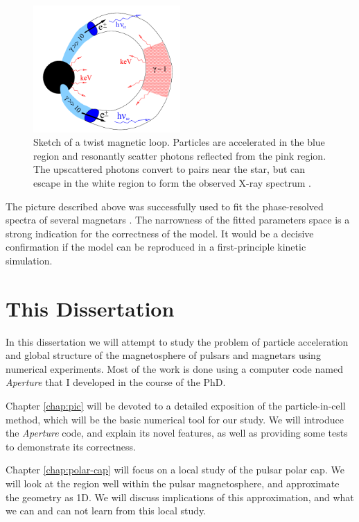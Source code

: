 \begin{figure}[h]
  \centering
  \includegraphics[width=0.5\textwidth]{pics/intro/magnetar-loop.png}
  \caption[Sketch of a twist magnetic loop.]{Sketch of a twist magnetic loop.
    Particles are accelerated in the blue region and resonantly scatter photons
    reflected from the pink region. The upscattered photons convert to pairs
    near the star, but can escape in the white region to form the observed X-ray
    spectrum \citep{beloborodov_mechanism_2013}.}
  \label{fig:magnetar-loop}
\end{figure}

The picture described above was successfully used to fit the phase-resolved
spectra of several magnetars \citep{hascoet_phase-resolved_2014}. The narrowness
of the fitted parameters space is a strong indication for the correctness of the
model. It would be a decisive confirmation if the model can be reproduced in a
first-principle kinetic simulation.

\section{This Dissertation}
\label{sec:intro-outline}

In this dissertation we will attempt to study the problem of particle
acceleration and global structure of the magnetosphere of pulsars and
magnetars using numerical experiments. Most of the work is done using a computer
code named {\it Aperture} that I developed in the course of the PhD.

Chapter \ref{chap:pic} will be devoted to a detailed exposition of the
particle-in-cell method, which will be the basic numerical tool for our study.
We will introduce the {\it Aperture} code, and explain its novel features, as
well as providing some tests to demonstrate its correctness.

Chapter \ref{chap:polar-cap} will focus on a local study of the pulsar
polar cap. We will look at the region well within the pulsar magnetosphere, and
approximate the geometry as 1D. We will discuss implications of this
approximation, and what we can and can not learn from this local study.

